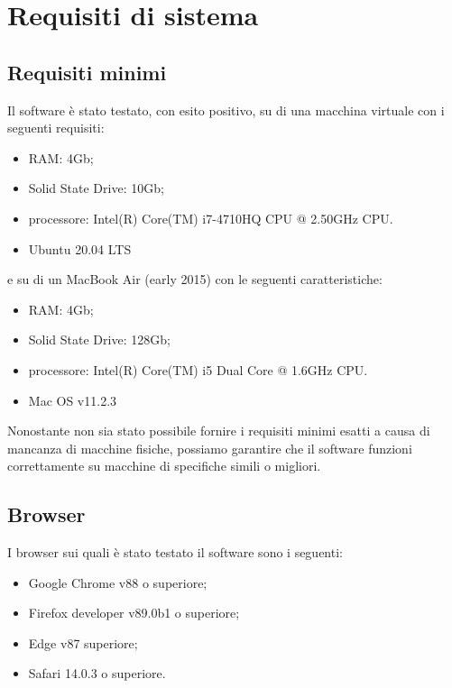 \chapter{Requisiti di sistema}\label{RequisitiDiSistema}
\section{Requisiti minimi}\label{RequisitiDiSistemaRequisitiMinimi}
Il software è stato testato, con esito positivo, su di una macchina virtuale con i seguenti requisiti:
\begin{itemize}
  \item RAM: 4Gb;
  \item Solid State Drive: 10Gb;
  \item processore: Intel(R) Core(TM) i7-4710HQ CPU @ 2.50GHz CPU.
  \item Ubuntu 20.04 LTS
\end{itemize}
e su di un MacBook Air (early 2015) con le seguenti caratteristiche:
\begin{itemize}
  \item RAM: 4Gb;
  \item Solid State Drive: 128Gb;
  \item processore: Intel(R) Core(TM) i5 Dual Core @ 1.6GHz CPU.
  \item Mac OS v11.2.3
\end{itemize}

Nonostante non sia stato possibile fornire i requisiti minimi esatti a causa di mancanza di macchine fisiche, possiamo garantire che il software funzioni correttamente su macchine di specifiche simili o migliori.

\section{Browser}\label{RequisitiDiSistemaBrowser}
I browser sui quali è stato testato il software sono i seguenti:
\begin{itemize}
  \item Google Chrome v88 o superiore;
  \item Firefox developer v89.0b1 o superiore;
  \item Edge v87 superiore;
  \item Safari 14.0.3 o superiore.
\end{itemize}
